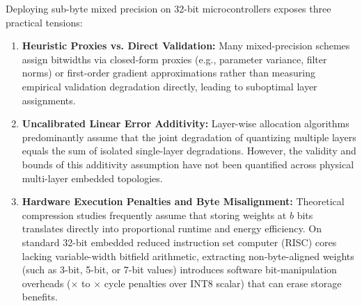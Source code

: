 \documentclass{ieeeaccess}
\begin{document}
Deploying sub-byte mixed precision on 32-bit microcontrollers exposes three practical tensions:
\begin{enumerate}
    \item \textbf{Heuristic Proxies vs. Direct Validation:} Many mixed-precision schemes assign bitwidths via closed-form proxies (e.g., parameter variance, filter norms) or first-order gradient approximations rather than measuring empirical validation degradation directly, leading to suboptimal layer assignments.
    \item \textbf{Uncalibrated Linear Error Additivity:} Layer-wise allocation algorithms predominantly assume that the joint degradation of quantizing multiple layers equals the sum of isolated single-layer degradations. However, the validity and bounds of this additivity assumption have not been quantified across physical multi-layer embedded topologies.
    \item \textbf{Hardware Execution Penalties and Byte Misalignment:} Theoretical compression studies frequently assume that storing weights at $b$ bits translates directly into proportional runtime and energy efficiency. On standard 32-bit embedded reduced instruction set computer (RISC) cores lacking variable-width bitfield arithmetic, extracting non-byte-aligned weights (such as 3-bit, 5-bit, or 7-bit values) introduces software bit-manipulation overheads (\MacroPenaltyScalarUnpackLow$\times$ to \MacroPenaltyScalarUnpackHigh$\times$ cycle penalties over INT8 scalar) that can erase storage benefits.
\end{enumerate}
\end{document}
